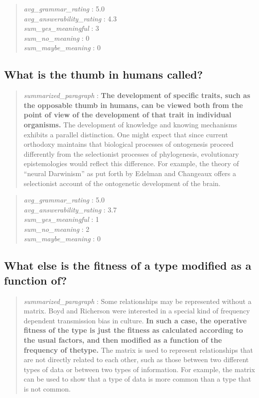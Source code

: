 \begin{quote}
\emph{avg\_grammar\_rating} : 5.0\\
\emph{avg\_answerability\_rating} : 4.3\\
\emph{sum\_yes\_meaningful} : 3\\
\emph{sum\_no\_meaning} : 0\\
\emph{sum\_maybe\_meaning} : 0
\end{quote}

\hypertarget{what-is-the-thumb-in-humans-called}{%
\subsection{What is the thumb in humans
called?}\label{what-is-the-thumb-in-humans-called}}

\begin{quote}
\emph{summarized\_paragraph} : \textbf{The development of specific
traits, such as the opposable thumb in humans, can be viewed both from
the point of view of the development of that trait in individual
organisms.} The development of knowledge and knowing mechanisms exhibits
a parallel distinction. One might expect that since current orthodoxy
maintains that biological processes of ontogenesis proceed differently
from the selectionist processes of phylogenesis, evolutionary
epistemologies would reflect this difference. For example, the theory of
``neural Darwinism'' as put forth by Edelman and Changeaux offers a
selectionist account of the ontogenetic development of the brain.
\end{quote}

\begin{quote}
\emph{avg\_grammar\_rating} : 5.0\\
\emph{avg\_answerability\_rating} : 3.7\\
\emph{sum\_yes\_meaningful} : 1\\
\emph{sum\_no\_meaning} : 2\\
\emph{sum\_maybe\_meaning} : 0
\end{quote}

\hypertarget{what-else-is-the-fitness-of-a-type-modified-as-a-function-of}{%
\subsection{What else is the fitness of a type modified as a function
of?}\label{what-else-is-the-fitness-of-a-type-modified-as-a-function-of}}

\begin{quote}
\emph{summarized\_paragraph} : Some relationships may be represented
without a matrix. Boyd and Richerson were interested in a special kind
of frequency dependent transmission bias in culture. \textbf{In such a
case, the operative fitness of the type is just the fitness as
calculated according to the usual factors, and then modified as a
function of the frequency of thetype.} The matrix is used to represent
relationships that are not directly related to each other, such as those
between two different types of data or between two types of information.
For example, the matrix can be used to show that a type of data is more
common than a type that is not common.
\end{quote}

